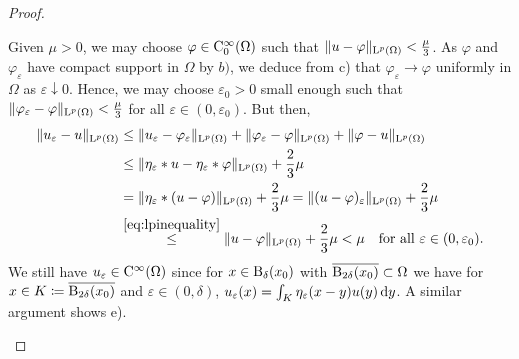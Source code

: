 \begin{proof}
\begin{enumerate}[a)]
    Given $\mu > 0$, we may choose $\varphi \in \mathrm{C}_0^\infty(\Omega)$ such that $\|u - \varphi\|_{\mathrm{L}^p(\Omega)} <  \frac{\mu}{3}$. 
    As $\varphi$ and $\varphi_\varepsilon$ have compact support in $\Omega$ by $b)$, we deduce from c) that $\varphi_\varepsilon \to \varphi$ uniformly in $\Omega$ as $\varepsilon \downarrow 0$.
    Hence, we may choose $\varepsilon_0 > 0$ small enough such that $\|\varphi_\varepsilon - \varphi\|_{\mathrm{L}^p(\Omega)} < \frac{\mu}{3}$ for all $\varepsilon \in (0, \varepsilon_0)$.
    But then,
    \begin{align*}
      \|u_\varepsilon - u\|_{\mathrm{L}^p(\Omega)}
      & \leq \|u_\varepsilon - \varphi_\varepsilon \|_{\mathrm{L}^p(\Omega)} + \|\varphi_\varepsilon - \varphi\|_{\mathrm{L}^p(\Omega)} + \|\varphi - u \|_{\mathrm{L}^p(\Omega)} \\
      &\leq \|\eta_\varepsilon \ast u - \eta_\varepsilon \ast \varphi \|_{\mathrm{L}^p(\Omega)} + \frac{2}{3} \mu \\
      &= \|\eta_\varepsilon \ast (u - \varphi) \|_{\mathrm{L}^p(\Omega)} + \frac{2}{3}\mu
      = \|(u - \varphi)_\varepsilon \|_{\mathrm{L}^p(\Omega)} + \frac{2}{3}\mu \\
      &\overset{\eqref{eq:lpinequality}}{\leq} \|u-\varphi\|_{\mathrm{L}^p(\Omega)} + \frac{2}{3}\mu < \mu \quad\text{for all } \varepsilon \in (0, \varepsilon_0).
    \end{align*}
    We still have $u_\varepsilon \in \mathrm{C}^\infty(\Omega)$ since for $x \in \mathrm{B}_\delta(x_0)$ with $\overline{\mathrm{B}_{2\delta}(x_0)} \subset \Omega$ we have for $x \in K \coloneqq \overline{\mathrm{B}_{2\delta}(x_0)}$ and $\varepsilon \in (0, \delta)$, $u_\varepsilon(x) = \int_K \eta_\varepsilon(x - y)u(y) \, {\operatorname{d}\!{y}}$.
    A similar argument shows e).\qedhere
  \end{enumerate}
\end{proof}


